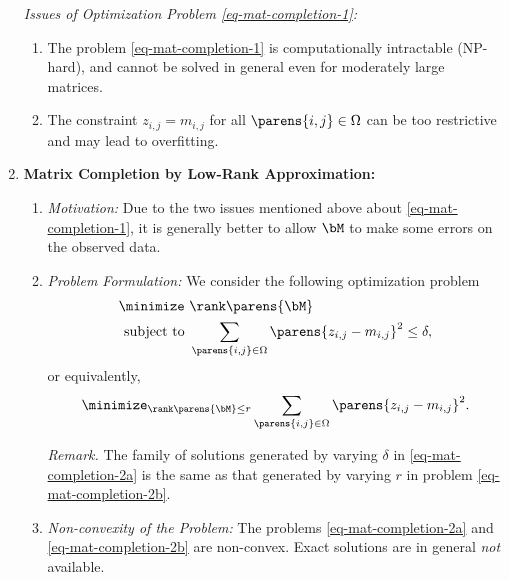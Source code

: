 \documentclass[12pt]{article}
\begin{document}
\begin{enumerate}[label=\textbf{\arabic*.}]
	\textit{Issues of Optimization Problem \eqref{eq-mat-completion-1}:}
	\begin{enumerate}
		\item The problem \eqref{eq-mat-completion-1} is computationally intractable (NP-hard), and cannot be solved in general even for moderately large matrices. 
		\item The constraint $z_{i,j} = m_{i,j}$ for all $\parens{i, j} \in \Omega$ can be too restrictive and may lead to overfitting. 
	\end{enumerate}
	
	\item \textbf{Matrix Completion by Low-Rank Approximation:} 
	\begin{enumerate}
		\item \textit{Motivation:} Due to the two issues mentioned above about \eqref{eq-mat-completion-1}, it is generally better to allow $\bM$ to make some errors on the observed data. 
		
		\item \textit{Problem Formulation:} We consider the following optimization problem 
		\begin{equation}\label{eq-mat-completion-2a}
			\begin{aligned}
				\minimize & \ \rank \parens{\bM} \\ 
				\text{ subject to} & \ \sum_{\parens{i,j} \in \Omega} \parens{z_{i,j} - m_{i,j}}^2 \le \delta, 
			\end{aligned}
		\end{equation}
		or equivalently, 
		\begin{align}\label{eq-mat-completion-2b}
			\minimize_{\rank \parens{\bM} \le r} \sum_{\parens{i,j} \in \Omega} \parens{z_{i,j} - m_{i,j}}^2. 
		\end{align}
		
		\textit{Remark.} The family of solutions generated by varying $\delta$ in \eqref{eq-mat-completion-2a} is the same as that generated by varying $r$ in problem \eqref{eq-mat-completion-2b}. 
		
		\item \textit{Non-convexity of the Problem:} The problems \eqref{eq-mat-completion-2a} and \eqref{eq-mat-completion-2b} are non-convex. Exact solutions are in general \emph{not} available. 
		

\end{enumerate}
\end{enumerate}
\end{document}
